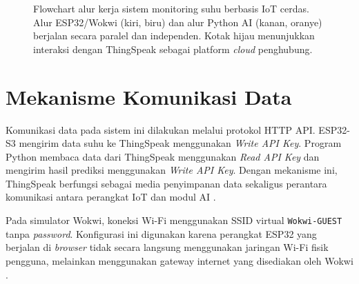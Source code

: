 \begin{figure}[H]
\caption{Flowchart alur kerja sistem monitoring suhu berbasis IoT cerdas. Alur ESP32/Wokwi (kiri, biru) dan alur Python AI (kanan, oranye) berjalan secara paralel dan independen. Kotak hijau menunjukkan interaksi dengan ThingSpeak sebagai platform \textit{cloud} penghubung.}
\label{fig:flowchart}
\end{figure}

\section{Mekanisme Komunikasi Data}

Komunikasi data pada sistem ini dilakukan melalui protokol HTTP API.
ESP32-S3 mengirim data suhu ke ThingSpeak menggunakan \textit{Write API Key}.
Program Python membaca data dari ThingSpeak menggunakan \textit{Read API Key}
dan mengirim hasil prediksi menggunakan \textit{Write API Key}. Dengan
mekanisme ini, ThingSpeak berfungsi sebagai media penyimpanan data sekaligus
perantara komunikasi antara perangkat IoT dan modul AI
\cite{thingspeak2024}.

Pada simulator Wokwi, koneksi Wi-Fi menggunakan SSID virtual
\texttt{Wokwi-GUEST} tanpa \textit{password}. Konfigurasi ini digunakan
karena perangkat ESP32 yang berjalan di \textit{browser} tidak secara
langsung menggunakan jaringan Wi-Fi fisik pengguna, melainkan menggunakan
gateway internet yang disediakan oleh Wokwi \cite{wokwi_wifi}.
